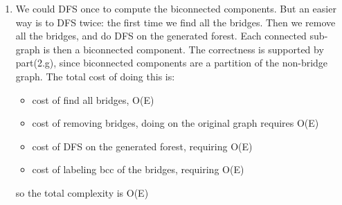 \documentclass[paper=a4, fontsize=11pt]{scrartcl} %
\numberwithin{equation}{section} %
\numberwithin{figure}{section} %
\numberwithin{table}{section} %
\begin{document}
\begin{enumerate}[label={2.(\alph*)}]
\begin{enumerate}
  \end{enumerate}


  \item 
    We could DFS once to compute the biconnected components. But an easier way is to DFS twice: the first time we find all the bridges. Then
    we remove all the bridges, and do DFS on the generated forest. Each connected sub-graph is then a biconnected component. The correctness
    is supported by part(2.g), since biconnected components are a partition of the non-bridge graph. The total cost of doing this is:
    \begin{itemize}
      \item cost of find all bridges, O(E)
      \item cost of removing bridges, doing on the original graph requires O(E)
      \item cost of DFS on the generated forest, requiring O(E)
      \item cost of labeling bcc of the bridges, requiring O(E)
    \end{itemize}
    so the total complexity is O(E)


\end{enumerate}


\end{document}

